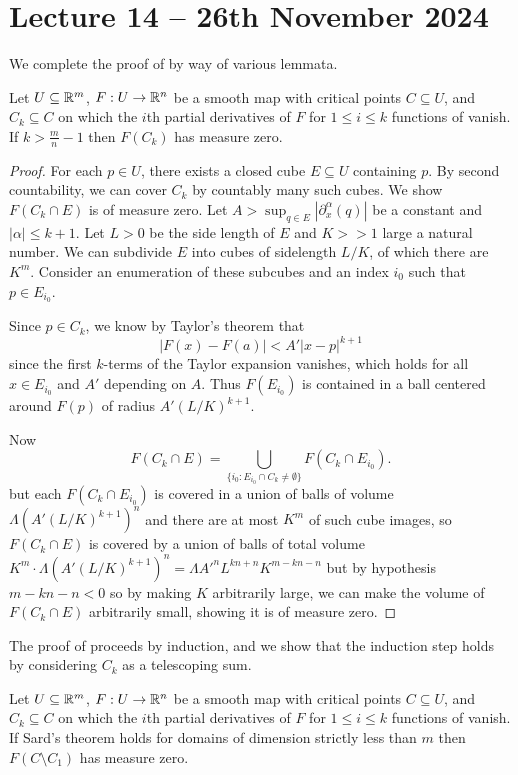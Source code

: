 \section{Lecture 14 -- 26th November 2024}\label{sec: lecture 14}
We complete the proof of  by way of various lemmata. 
\begin{lemma}\label{lem: Ck for k large have measure zero image}
    Let $U\subseteq\mathbb{R}^{m}$, $F:U\to\mathbb{R}^{n}$ be a smooth map with critical points $C\subseteq U$, and $C_{k}\subseteq C$ on which the $i$th partial derivatives of $F$ for $1\leq i\leq k$ functions of vanish. If $k>\frac{m}{n}-1$ then $F(C_{k})$ has measure zero. 
\end{lemma}
\begin{proof}
    For each $p\in U$, there exists a closed cube $E\subseteq U$ containing $p$. By second countability, we can cover $C_{k}$ by countably many such cubes. We show $F(C_{k}\cap E)$ is of measure zero. Let $A>\sup_{q\in E}|\partial_{x}^{\alpha}(q)|$ be a constant and $|\alpha|\leq k+1$. Let $L>0$ be the side length of $E$ and $K>>1$ large a natural number. We can subdivide $E$ into cubes of sidelength $L/K$, of which there are $K^{m}$. Consider an enumeration of these subcubes and an index $i_{0}$ such that $p\in E_{i_{0}}$. 

    Since $p\in C_{k}$, we know by Taylor's theorem that 
    $$|F(x)-F(a)|<A'|x-p|^{k+1}$$
    since the first $k$-terms of the Taylor expansion vanishes, which holds for all $x\in E_{i_{0}}$ and $A'$ depending on $A$. Thus $F(E_{i_{0}})$ is contained in a ball centered around $F(p)$ of radius $A'(L/K)^{k+1}$. 

    Now 
    $$F(C_{k}\cap E)=\bigcup_{\{i_{0}:E_{i_{0}}\cap C_{k}\neq\emptyset\}}F(C_{k}\cap E_{i_{0}}).$$
    but each $F(C_{k}\cap E_{i_{0}})$ is covered in a union of balls of volume $\Lambda\left(A'(L/K)^{k+1}\right)^{n}$ and there are at most $K^{m}$ of such cube images, so $F(C_{k}\cap E)$ is covered by a union of balls of total volume $K^{m}\cdot\Lambda\left(A'(L/K)^{k+1}\right)^{n}=\Lambda A'^{n}L^{kn+n}K^{m-kn-n}$ but by hypothesis $m-kn-n<0$ so by making $K$ arbitrarily large, we can make the volume of $F(C_{k}\cap E)$ arbitrarily small, showing it is of measure zero. 
\end{proof}
The proof of  proceeds by induction, and we show that the induction step holds by considering $C_{k}$ as a telescoping sum. 
\begin{lemma}\label{lem: C minus C1 is measure zero}
    Let $U\subseteq\mathbb{R}^{m}$, $F:U\to\mathbb{R}^{n}$ be a smooth map with critical points $C\subseteq U$, and $C_{k}\subseteq C$ on which the $i$th partial derivatives of $F$ for $1\leq i\leq k$ functions of vanish. If Sard's theorem holds for domains of dimension strictly less than $m$ then $F(C\setminus C_{1})$ has measure zero. 
\end{lemma}
